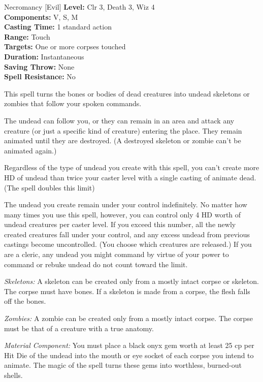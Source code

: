 {Necromancy [Evil]}
{
	\textbf{Level:}
	Clr 3, Death 3, Wiz 4\\
	\textbf{Components:}
	V, S, M\\
	\textbf{Casting Time:}
	1 standard action\\
	\textbf{Range:}
	Touch\\
	\textbf{Targets:}
	One or more corpses touched\\
	\textbf{Duration:}
	Instantaneous\\
	\textbf{Saving Throw:}
	None\\
	\textbf{Spell Resistance:}
	No\\
}
{
	This spell turns the bones or bodies of dead creatures into undead skeletons or zombies that follow your spoken commands.

	The undead can follow you, or they can remain in an area and attack any creature (or just a specific kind of creature) entering the place. They remain animated until they are destroyed. (A destroyed skeleton or zombie can't be animated again.)

	Regardless of the type of undead you create with this spell, you can't create more HD of undead than twice your caster level with a single casting of animate dead. (The  spell doubles this limit)

	The undead you create remain under your control indefinitely. No matter how many times you use this spell, however, you can control only 4 HD worth of undead creatures per caster level. If you exceed this number, all the newly created creatures fall under your control, and any excess undead from previous castings become uncontrolled. (You choose which creatures are released.) If you are a cleric, any undead you might command by virtue of your power to command or rebuke undead do not count toward the limit.

	\textit{Skeletons:}
	A skeleton can be created only from a mostly intact corpse or skeleton. The corpse must have bones. If a skeleton is made from a corpse, the flesh falls off the bones.

	\textit{Zombies:}
	A zombie can be created only from a mostly intact corpse. The corpse must be that of a creature with a true anatomy.

	\textit{Material Component:}
	You must place a black onyx gem worth at least 25 cp per Hit Die of the undead into the mouth or eye socket of each corpse you intend to animate. The magic of the spell turns these gems into worthless, burned-out shells.

}
